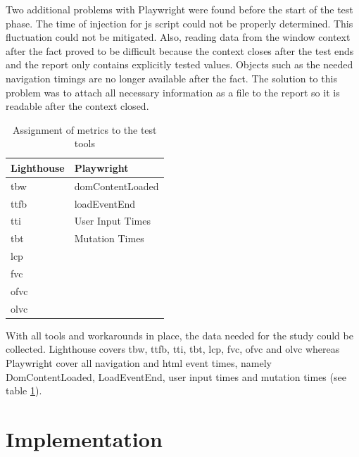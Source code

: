 \documentclass[a4paper, 12pt]{article}
\begin{document}
Two additional problems with Playwright were found before the start of the test phase.
The time of injection for \acrshort{js} script could not be properly determined.
This fluctuation could not be mitigated.
Also, reading data from the window context after the fact proved to be difficult because the context closes after the test ends and the report only contains explicitly tested values.
Objects such as the needed navigation timings are no longer available after the fact.
The solution to this problem was to attach all necessary information as a file to the report so it is readable after the context closed.

\begin{table}[h]
  \begin{center}
    \begin{tabular}{|l|l|}
      \hline
      \textbf{Lighthouse} & \textbf{Playwright} \\ \hline
      \acrfull{tbw}       & domContentLoaded    \\ \hline
      \acrfull{ttfb}      & loadEventEnd        \\ \hline
      \acrfull{tti}       & User Input Times    \\ \hline
      \acrfull{tbt}       & Mutation Times      \\ \hline
      \acrfull{lcp}       &                     \\ \hline
      \acrfull{fvc}       &                     \\ \hline
      \acrfull{ofvc}      &                     \\ \hline
      \acrfull{olvc}      &                     \\ \hline
    \end{tabular}
  \end{center}
  \caption{Assignment of metrics to the test tools}
  \label{tab:metricassignment}
\end{table}

With all tools and workarounds in place, the data needed for the study could be collected.
Lighthouse covers \acrshort{tbw}, \acrshort{ttfb}, \acrshort{tti}, \acrshort{tbt}, \acrshort{lcp}, \acrshort{fvc}, \acrshort{ofvc} and \acrshort{olvc} whereas Playwright cover all navigation and \acrshort{html} event times, namely DomContentLoaded, LoadEventEnd, user input times and mutation times (see table \ref{tab:metricassignment}).

\section{Implementation}\label{sec:implementation} 
% 
\end{document}
